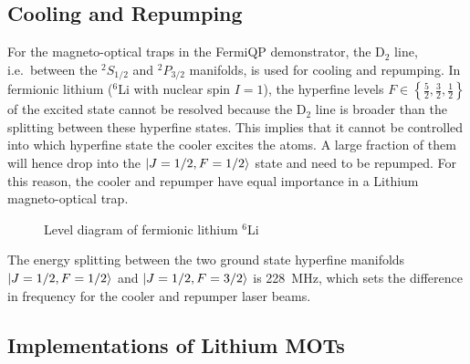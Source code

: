 \subsection*{Cooling and Repumping}
For the magneto-optical traps in the FermiQP demonstrator, the D$_2$ line, i.e.~between the $^2S_{1/2}$ and $^2P_{3/2}$ manifolds, is used for cooling and repumping. In fermionic lithium ($^6$Li with nuclear spin $I = 1$), the hyperfine levels $F \in \left\{\frac{5}{2}, \frac{3}{2}, \frac{1}{2}\right\}$ of the excited state cannot be resolved because the D$_2$ line is broader than the splitting between these hyperfine states. This implies that it cannot be controlled into which hyperfine state the cooler excites the atoms. A large fraction of them will hence drop into the $\Ket{J=1/2, F=1/2}$ state and need to be repumped. For this reason, the cooler and repumper have equal importance in a Lithium magneto-optical trap.

\begin{figure}
    \caption{Level diagram of fermionic lithium $^6$Li}\label{fig:lithium_level_diagram}
\end{figure}

The energy splitting between the two ground state hyperfine manifolds $\Ket{J=1/2, F=1/2}$ and $\Ket{J=1/2, F=3/2}$ is \SI{228}{\mega\hertz}, which sets the difference in frequency for the cooler and repumper laser beams.

\subsection*{Implementations of Lithium MOTs}